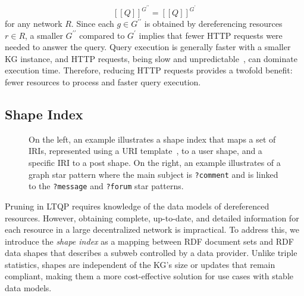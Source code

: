 \begin{equation}\label{eq:evalQueryStructuralAssumption}
   [\![ Q ]\!]^{G^{\prime\prime}} = [\![ Q ]\!]^{G^{\prime}}
\end{equation}
for any network $R$.
Since each $g \in G^{\prime\prime}$ is obtained by dereferencing resources $r \in R$, a smaller $G^{\prime\prime}$ compared to $G^{\prime}$ implies that fewer HTTP requests were needed to answer the query. 
Query execution is generally faster with a smaller KG instance, and HTTP requests, being slow and unpredictable~\cite{hartig2016walking}, can dominate execution time. 
Therefore, reducing HTTP requests provides a twofold benefit: fewer resources to process and faster query execution.


\subsection{Shape Index}

\begin{figure*}
   \centering
   \begin{minipage}[t]{0.45\linewidth}
      \centering
      
   \end{minipage}
   \begin{minipage}[t]{0.45\linewidth}
      \centering
      
   \end{minipage}

   \caption{
      On the left, an example illustrates a shape index that maps a set of IRIs, represented using a URI template~\cite{ietf6570Template}, to a user shape, and a specific IRI to a post shape.
      On the right, an example illustrates of a graph star pattern where the main subject is \texttt{?comment} and is linked to the \texttt{?message} and \texttt{?forum} star patterns.}
   \label{fig:shapeIndex}
\end{figure*}

Pruning in LTQP requires knowledge of the data models of dereferenced resources.  
However, obtaining complete, up-to-date, and detailed information for each resource in a large decentralized network is impractical.  
To address this, we introduce the \emph{shape index} as a mapping between RDF document sets and RDF data shapes that describes a subweb controlled by a data provider.  
Unlike triple statistics, shapes are independent of the KG's size or updates that remain compliant, making them a more cost-effective solution for use cases with stable data models. 

